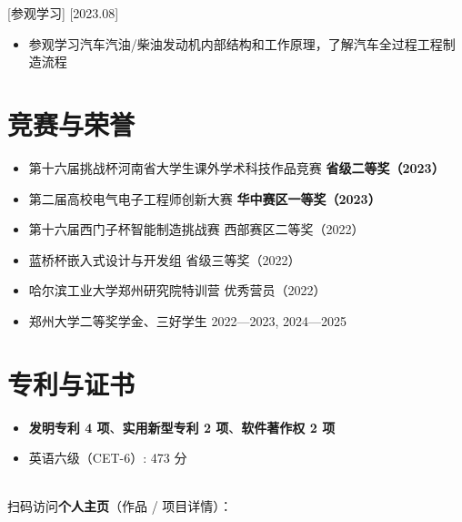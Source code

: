 \documentclass{resume-photo}
\newcommand{\hl}[1]{\textbf{\textcolor{hlred}{#1}}}
\begin{document}
[\textnormal{参观学习}]
[2023.08]

\begin{itemize}
  \item 参观学习汽车汽油/柴油发动机内部结构和工作原理，了解汽车全过程工程制造流程
\end{itemize}

\section{竞赛与荣誉}
\begin{itemize}
  \item 第十六届挑战杯河南省大学生课外学术科技作品竞赛 \hfill \hl{省级二等奖（2023）}
  \item 第二届高校电气电子工程师创新大赛 \hfill \hl{华中赛区一等奖（2023）}
  \item 第十六届西门子杯智能制造挑战赛 \hfill 西部赛区二等奖（2022）
  \item 蓝桥杯嵌入式设计与开发组 \hfill 省级三等奖（2022）
  \item 哈尔滨工业大学郑州研究院特训营 \hfill 优秀营员（2022）
  \item 郑州大学二等奖学金、三好学生 \hfill 2022—2023, 2024—2025
\end{itemize}

\section{专利与证书}
\begin{itemize}
  \item \hl{发明专利 4 项}、\hl{实用新型专利 2 项}、\hl{软件著作权 2 项}
  \item 英语六级（CET-6）: 473 分
\end{itemize}

\vfill
\begin{center}
  \\[4pt]
  {\footnotesize 扫码访问\hl{个人主页}（作品 / 项目详情）：}
\end{center}
\end{document}
